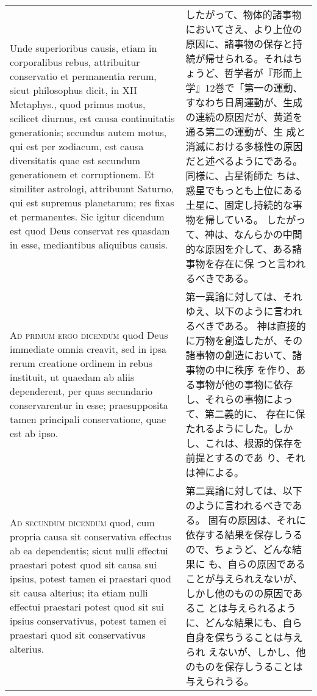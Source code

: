 \documentclass[10pt]{jsarticle} %
\begin{document}
\begin{longtable}{p{21em}p{21em}}
\\


Unde superioribus
causis, etiam in corporalibus rebus, attribuitur conservatio et
permanentia rerum, sicut philosophus dicit, in XII Metaphys., quod
primus motus, scilicet diurnus, est causa continuitatis generationis;
secundus autem motus, qui est per zodiacum, est causa diversitatis quae
est secundum generationem et corruptionem. Et similiter astrologi,
attribuunt Saturno, qui est supremus planetarum; res fixas et
permanentes. Sic igitur dicendum est quod Deus conservat res quasdam in
esse, mediantibus aliquibus causis.

&

したがって、物体的諸事物においてさえ、より上位の原因に、諸事物の保存と持
 続が帰せられる。それはちょうど、哲学者が『形而上学』12巻で「第一の運動、
 すなわち日周運動が、生成の連続の原因だが、黄道を通る第二の運動が、生
 成と消滅における多様性の原因だと述べるようにである。同様に、占星術師た
 ちは、惑星でもっとも上位にある土星に、固定し持続的な事物を帰している。
 したがって、神は、なんらかの中間的な原因を介して、ある諸事物を存在に保
 つと言われるべきである。


\\


{\scshape Ad primum ergo dicendum} quod Deus immediate
omnia creavit, sed in ipsa rerum creatione ordinem in rebus instituit,
ut quaedam ab aliis dependerent, per quas secundario conservarentur in
esse; praesupposita tamen principali conservatione, quae est ab ipso.

&

第一異論に対しては、それゆえ、以下のように言われるべきである。
神は直接的に万物を創造したが、その諸事物の創造において、諸事物の中に秩序
 を作り、ある事物が他の事物に依存し、それらの事物によって、第二義的に、
 存在に保たれるようにした。しかし、これは、根源的保存を前提とするのであ
 り、それは神による。

\\


{\scshape Ad secundum dicendum} quod, cum propria causa
sit conservativa effectus ab ea dependentis; sicut nulli effectui
praestari potest quod sit causa sui ipsius, potest tamen ei praestari
quod sit causa alterius; ita etiam nulli effectui praestari potest quod
sit sui ipsius conservativus, potest tamen ei praestari quod sit
conservativus alterius.

&


第二異論に対しては、以下のように言われるべきである。
固有の原因は、それに依存する結果を保存しうるので、ちょうど、どんな結果に
 も、自らの原因であることが与えられえないが、しかし他のものの原因であるこ
 とは与えられるように、どんな結果にも、自ら自身を保ちうることは与えられ
 えないが、しかし、他のものを保存しうることは与えられうる。


\end{longtable}
\end{document}

